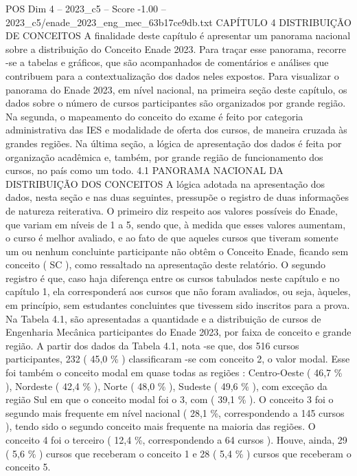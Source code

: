 \begin{textsample}{POS Dim 4 – 2023\_c5 – Score -1.00 – 2023\_c5/enade\_2023\_eng\_mec\_63b17ce9db.txt}  \label{ex:f4_pos_272}
CAPÍTULO 4 DISTRIBUIÇÃO DE CONCEITOS A finalidade deste capítulo é apresentar um panorama nacional sobre a distribuição do Conceito Enade 2023.
Para traçar esse panorama, recorre -se a tabelas e gráficos, que são acompanhados de comentários e análises que contribuem para a contextualização dos dados neles expostos.
Para visualizar o panorama do Enade 2023, em nível nacional, na primeira seção deste capítulo, os dados sobre o número de cursos participantes são organizados por grande região.
Na segunda, o mapeamento do conceito do exame é feito por categoria administrativa das IES e modalidade de oferta dos cursos, de maneira cruzada às grandes regiões.
Na última seção, a lógica de apresentação dos dados é feita por organização acadêmica e, também, por grande região de funcionamento dos cursos, no país como um todo. 4.1 PANORAMA NACIONAL DA DISTRIBUIÇÃO DOS CONCEITOS A lógica adotada na apresentação dos dados, nesta seção e nas duas seguintes, pressupõe o registro de duas informações de natureza reiterativa.
O primeiro diz respeito aos valores possíveis do Enade, que variam em níveis de 1 a 5, sendo que, à medida que esses valores aumentam, o curso é melhor avaliado, e ao fato de que aqueles cursos que tiveram somente um ou nenhum concluinte participante não obtêm o Conceito Enade, ficando sem conceito ( SC ), como ressaltado na apresentação deste relatório.
O segundo registro é que, caso haja diferença entre os cursos tabulados neste capítulo e no capítulo 1, ela corresponderá aos cursos que não foram avaliados, ou seja, àqueles, em princípio, sem estudantes concluintes que tivessem sido inscritos para a prova.
Na Tabela 4.1, são apresentadas a quantidade e a distribuição de cursos de Engenharia Mecânica participantes do Enade 2023, por faixa de conceito e grande região.
A partir dos dados da Tabela 4.1, nota -se que, dos 516 cursos participantes, 232 ( 45,0 \% ) classificaram -se com conceito 2, o valor modal.
Esse foi também o conceito modal em quase todas as regiões : Centro-Oeste ( 46,7 \% ), Nordeste ( 42,4 \% ), Norte ( 48,0 \% ), Sudeste ( 49,6 \% ), com exceção da região Sul em que o conceito modal foi o 3, com ( 39,1 \% ).
O conceito 3 foi o segundo mais frequente em nível nacional ( 28,1 \%, correspondendo a 145 cursos ), tendo sido o segundo conceito mais frequente na maioria das regiões.
O conceito 4 foi o terceiro ( 12,4 \%, correspondendo a 64 cursos ).
Houve, ainda, 29 ( 5,6 \% ) cursos que receberam o conceito 1 e 28 ( 5,4 \% ) cursos que receberam o conceito 5.

\end{textsample}
